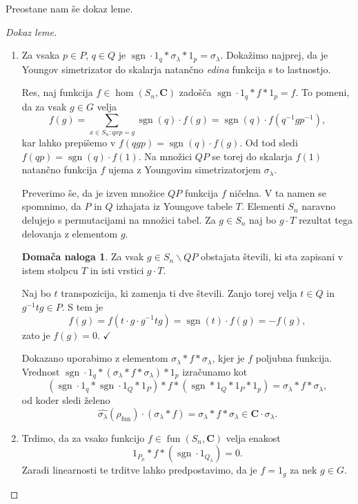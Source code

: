 \documentclass[11pt]{book}
\def\CC{\mathbf{C}}
\def\youngsym{\sigma_{\lambda}}
\DeclareMathOperator\sgn{sgn}
\DeclareMathOperator\fun{fun}
\def\kljuka{$\checkmark$}
\theoremstyle{definition}
\theoremstyle{zgled}
\theoremstyle{odprtproblem}
\theoremstyle{domacanaloga}
\newtheorem*{domacanaloga}{Domača naloga}
\newenvironment{dokaz}
    {\color{siva}\begin{proof}}
    {\end{proof}}
\theoremstyle{izrek}
\begin{document}
Preostane nam še dokaz leme.

\begin{dokaz}[Dokaz leme] \leavevmode
\begin{enumerate}
    \item Za vsaka $p \in P$, $q \in Q$ je $\sgn \cdot 1_q * \youngsym * 1_p = \youngsym$. Dokažimo najprej, da je Youngov simetrizator do skalarja natančno \emph{edina} funkcija s to lastnostjo. 
    
    Res, naj funkcija $f \in \hom(S_n, \CC)$ zadošča $\sgn \cdot 1_q * f * 1_p = f$. To pomeni, da za vsak $g \in G$ velja
    \[
        f(g) = \sum_{x \in S_n \colon q x p = g} \sgn(q) \cdot f(g) = \sgn(q) \cdot f(q^{-1} g p^{-1}),
    \]
    kar lahko prepišemo v $f(qgp) = \sgn(q) \cdot f(g)$. Od tod sledi $f(qp) = \sgn(q) \cdot f(1)$. Na množici $QP$ se torej do skalarja $f(1)$ natančno funkcija $f$ ujema z Youngovim simetrizatorjem $\youngsym$. 
    
    Preverimo še, da je izven množice $QP$ funkcija $f$ ničelna. V ta namen se spomnimo, da $P$ in $Q$ izhajata iz Youngove tabele $T$. Elementi $S_n$ naravno delujejo s permutacijami na množici tabel. Za $g \in S_n$ naj bo $g \cdot T$ rezultat tega delovanja z elementom $g$.

    \begin{domacanaloga}
    Za vsak $g \in S_n \backslash QP$ obstajata števili, ki sta zapisani v istem stolpcu $T$ in isti vrstici $g \cdot T$.
    \end{domacanaloga}

    Naj bo $t$ transpozicija, ki zamenja ti dve števili. Zanjo torej velja $t \in Q$ in $g^{-1} t g \in P$. S tem je
    \[
        f(g) = f(t \cdot g \cdot g^{-1} t g) = \sgn(t) \cdot f(g) = - f(g),
    \]
    zato je $f(g) = 0$. \kljuka

    Dokazano uporabimo z elementom $\youngsym * f * \youngsym$, kjer je $f$ poljubna funkcija. Vrednost $\sgn \cdot 1_q * (\youngsym * f * \youngsym) * 1_p$ izračunamo kot
    \[
        (\sgn \cdot 1_q * \sgn \cdot 1_Q * 1_P) * f * (\sgn * 1_Q * 1_P * 1_p) =
        \youngsym * f * \youngsym,
    \]
    od koder sledi želeno
    \[
        \widehat{\youngsym}(\rho_{\fun}) \cdot (\youngsym * f) = \youngsym * f * \youngsym \in \CC \cdot \youngsym.
    \]

    \item Trdimo, da za vsako funkcijo $f \in \fun(S_n, \CC)$ velja enakost
    \[    
        1_{P_\mu} * f * (\sgn \cdot 1_{Q_{\lambda}}) = 0.
    \]
    Zaradi linearnosti te trditve lahko predpostavimo, da je $f = 1_g$ za nek $g \in G$. 
    

\end{enumerate}
\end{dokaz}
\end{document}
